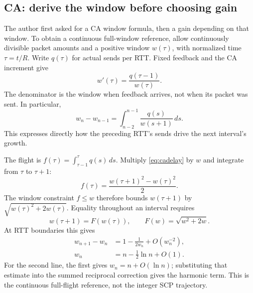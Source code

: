 \documentclass[sigconf,nonacm]{acmart}
\begin{document}
\subsection{CA: derive the window before choosing gain}
The author first asked for a CA window formula, then a gain depending on that window. To obtain a continuous full-window reference, allow continuously divisible packet amounts and a positive window $w(\tau)$, with normalized time $\tau=t/R$. Write $q(\tau)$ for actual sends per RTT. Fixed feedback and the CA increment give
\begin{equation}
 w'(\tau)=\frac{q(\tau-1)}{w(\tau)}.
 \label{eq:cadelay}
\end{equation}
The denominator is the window when feedback arrives, not when its packet was sent. In particular,
\begin{equation}
 w_n-w_{n-1}=\int_{n-2}^{n-1}\frac{q(s)}{w(s+1)}\,ds.
\end{equation}
This expresses directly how the preceding RTT's sends drive the next interval's growth.

The flight is $f(\tau)=\int_{\tau-1}^{\tau}q(s)\,ds$. Multiply \eqref{eq:cadelay} by $w$ and integrate from $\tau$ to $\tau+1$:
\begin{equation}
 f(\tau)=\frac{w(\tau+1)^2-w(\tau)^2}{2}.
 \label{eq:caflight}
\end{equation}
The window constraint $f\le w$ therefore bounds $w(\tau+1)$ by $\sqrt{w(\tau)^2+2w(\tau)}$. Equality throughout an interval requires
\begin{equation}
 w(\tau+1)=F(w(\tau)),\qquad F(w)=\sqrt{w^2+2w}.
 \label{eq:camap}
\end{equation}
At RTT boundaries this gives
\begin{equation}\begin{aligned}
 w_{n+1}-w_n&=1-\frac1{2w_n}+O(w_n^{-2}),\\
 w_n&=n-\frac12\ln n+O(1).
\end{aligned}\label{eq:cafillgrowth}\end{equation}
For the second line, the first gives $w_n=n+O(\ln n)$; substituting that estimate into the summed reciprocal correction gives the harmonic term. This is the continuous full-flight reference, not the integer SCP trajectory.
\end{document}
